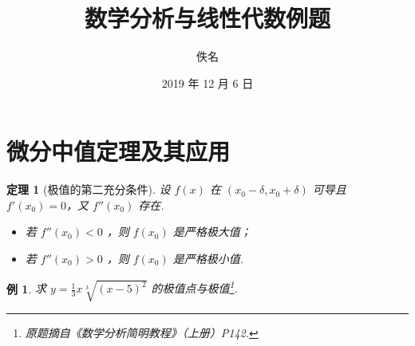 \documentclass[UTF8,11pt]{ctexart}
\title{数学分析与线性代数例题}
\author{佚名}
\date{2019 年 12 月 6 日}
\newtheorem{theorem}{定理}
\newtheorem{sample}{例}
\begin{document}
\maketitle
\tableofcontents

\section{微分中值定理及其应用}
\begin{theorem}[极值的第二充分条件]
    设 $f(x)$ 在 $(x_0 - \delta , x_0 + \delta)$ 可导且 $f'(x_0)=0$，又 $f''(x_0)$ 存在.
    \begin{itemize}
        \item[1)] 若 $f''(x_0) < 0$ ，则 $f(x_0)$ 是严格极大值；
        \item[2)] 若 $f''(x_0) > 0$ ，则 $f(x_0)$ 是严格极小值.
    \end{itemize}
\end{theorem}

\begin{sample}
    求 $y = \frac{1}{3} x \sqrt[3]{(x - 5)^2}$ 的极值点与极值\footnote{原题摘自《数学分析简明教程》（上册）P142.}.
\end{sample}
\end{document}
